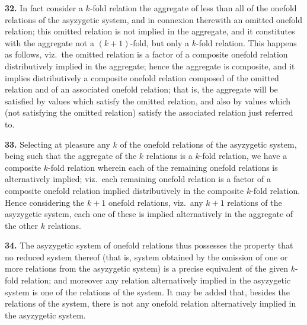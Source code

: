 \documentclass[11pt,a4paper]{article}
\theoremstyle{definition}
\begin{document}
\noindent\textbf{32.} In fact consider a $k$-fold relation the aggregate of less than all of the onefold relations of the asyzygetic system, and in connexion therewith an omitted onefold relation; this omitted relation is not implied in the aggregate, and it constitutes with the aggregate not a $(k+1)$-fold, but only a $k$-fold relation. This happens as follows, viz.\ the omitted relation is a factor of a composite onefold relation distributively implied in the aggregate; hence the aggregate is composite, and it implies distributively a composite onefold relation composed of the omitted relation and of an associated onefold relation; that is, the aggregate will be satisfied by values which satisfy the omitted relation, and also by values which (not satisfying the omitted relation) satisfy the associated relation just referred to.

\noindent\textbf{33.} Selecting at pleasure any $k$ of the onefold relations of the asyzygetic system, being such that the aggregate of the $k$ relations is a $k$-fold relation, we have a composite $k$-fold relation wherein each of the remaining onefold relations is alternatively implied; viz.\ each remaining onefold relation is a factor of a composite onefold relation implied distributively in the composite $k$-fold relation. Hence considering the $k+1$ onefold relations, viz.\ any $k+1$ relations of the asyzygetic system, each one of these is implied alternatively in the aggregate of the other $k$ relations.

\noindent\textbf{34.} The asyzygetic system of onefold relations thus possesses the property that no reduced system thereof (that is, system obtained by the omission of one or more relations from the asyzygetic system) is a precise equivalent of the given $k$-fold relation; and moreover any relation alternatively implied in the asyzygetic system is one of the relations of the system. It may be added that, besides the relations of the system, there is not any onefold relation alternatively implied in the asyzygetic system.
\end{document}
